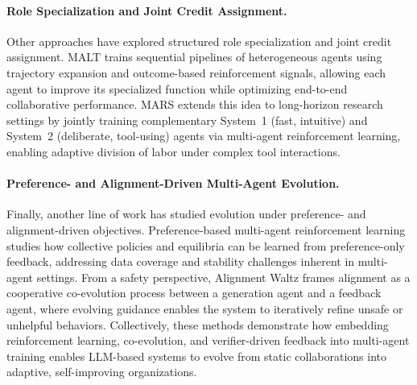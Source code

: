 \paragraph{Role Specialization and Joint Credit Assignment.}
Other approaches have explored structured role specialization and joint credit assignment. MALT \cite{MALT} trains sequential pipelines of heterogeneous agents using trajectory expansion and outcome-based reinforcement signals, allowing each agent to improve its specialized function while optimizing end-to-end collaborative performance. MARS \cite{mars} extends this idea to long-horizon research settings by jointly training complementary System~1 (fast, intuitive) and System~2 (deliberate, tool-using) agents via multi-agent reinforcement learning, enabling adaptive division of labor under complex tool interactions.

\paragraph{Preference- and Alignment-Driven Multi-Agent Evolution.}
Finally, another line of work has studied evolution under preference- and alignment-driven objectives. Preference-based multi-agent reinforcement learning \cite{marlhf} studies how collective policies and equilibria can be learned from preference-only feedback, addressing data coverage and stability challenges inherent in multi-agent settings. From a safety perspective, Alignment Waltz \cite{alignment-waltz} frames alignment as a cooperative co-evolution process between a generation agent and a feedback agent, where evolving guidance enables the system to iteratively refine unsafe or unhelpful behaviors. Collectively, these methods demonstrate how embedding reinforcement learning, co-evolution, and verifier-driven feedback into multi-agent training enables LLM-based systems to evolve from static collaborations into adaptive, self-improving organizations.